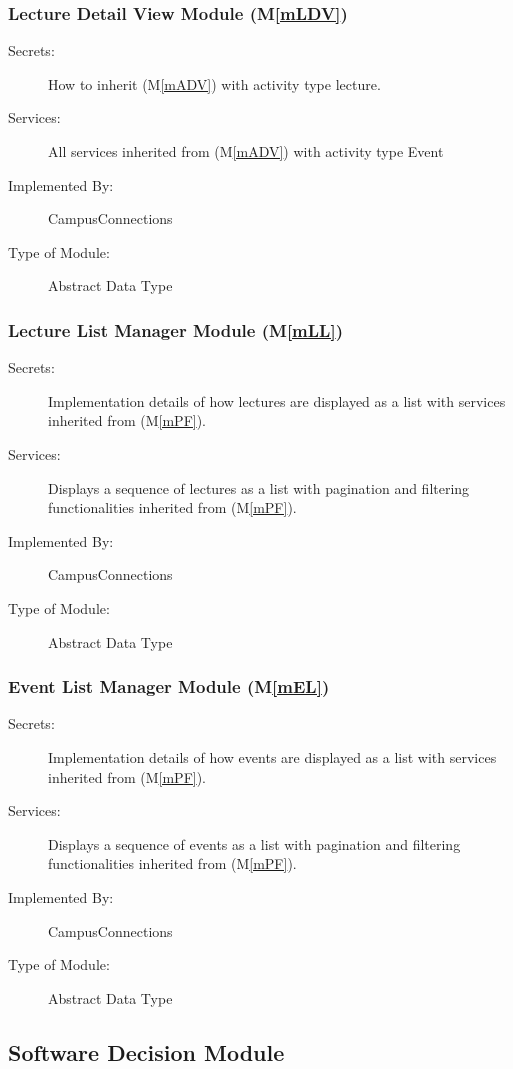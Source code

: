 \documentclass[12pt, titlepage]{article}
\newcommand{\mref}[1]{M\ref{#1}}
\begin{document}
\subsubsection{Lecture Detail View Module (\mref{mLDV})}
\begin{description}
\item[Secrets:]How to inherit (\mref{mADV}) with activity type lecture.
\item[Services:]All services inherited from (\mref{mADV}) with activity type Event
\item[Implemented By:] CampusConnections
\item[Type of Module:] Abstract Data Type
\end{description}

\subsubsection{Lecture List Manager Module (\mref{mLL})}
\begin{description}
\item[Secrets:]Implementation details of how lectures are displayed as a list with services inherited from (\mref{mPF}).
\item[Services:]Displays a sequence of lectures as a list with pagination and filtering functionalities inherited from (\mref{mPF}).
\item[Implemented By:] CampusConnections
\item[Type of Module:] Abstract Data Type
\end{description}

\subsubsection{Event List Manager Module (\mref{mEL})}
\begin{description}
\item[Secrets:]Implementation details of how events are displayed as a list with services inherited from (\mref{mPF}).
\item[Services:]Displays a sequence of events as a list with pagination and filtering functionalities inherited from (\mref{mPF}).
\item[Implemented By:] CampusConnections
\item[Type of Module:] Abstract Data Type
\end{description}

\subsection{Software Decision Module}
\end{document}
